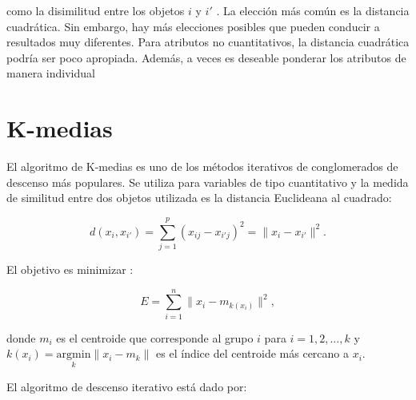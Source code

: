 como la disimilitud entre los objetos $i$ y $i'$ \citep{hastie09}. La elección más común es la distancia cuadrática. Sin embargo, hay más elecciones posibles que pueden conducir a resultados muy diferentes. Para atributos no cuantitativos, la distancia cuadrática podría ser poco apropiada. Además, a veces es deseable ponderar los atributos de manera individual 

\section{K-medias}
El algoritmo de K-medias es uno de los métodos iterativos de conglomerados de descenso más populares. Se utiliza para variables de tipo cuantitativo y la medida de similitud entre dos objetos utilizada es la distancia Euclideana al cuadrado:

\begin{equation}
d(x_{i},x_{i'})= \sum_{j=1}^p (x_{ij}-x_{i'j})^2 = \| x_{i}-x_{i'} \|^2.
\end{equation}



El objetivo es minimizar :


\begin{equation}\label{eq:kmedias}
E = \sum_{i=1}^{n} \| x_{i} - m_{k(x_{i})} \| ^2,
\end{equation}



donde $m_{i}$ es el centroide que corresponde al grupo $i$ para $i=1, 2, \dots, k$  y $k(x_{i})=\underset{k}{\textrm{argmin}} \| x_{i}-m_{k} \| $ es el índice del centroide más cercano a $x_{i}$.

El algoritmo de descenso iterativo está dado por:

